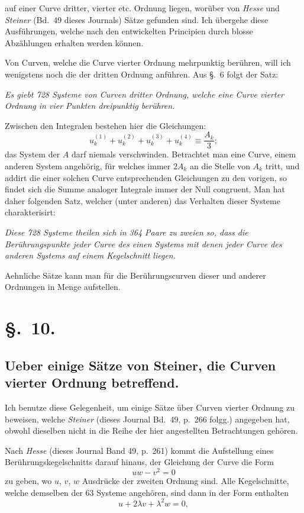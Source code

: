 \documentclass{article}
\begin{document}
auf einer Curve dritter, vierter etc. Ordnung liegen, worüber von \emph{Hesse} und \emph{Steiner} (Bd.\ 49 dieses Journals) Sätze gefunden sind. Ich übergehe diese Ausführungen, welche nach den entwickelten Principien durch blosse Abzählungen erhalten werden können.

Von Curven, welche die Curve vierter Ordnung mehrpunktig berühren, will ich wenigstens noch die der dritten Ordnung anführen. Aus §.~6 folgt der Satz:

\emph{Es giebt 728 Systeme von Curven dritter Ordnung, welche eine Curve vierter Ordnung in vier Punkten dreipunktig berühren.}

Zwischen den Integralen bestehen hier die Gleichungen:
\[
u_{k}^{(1)}+u_{k}^{(2)}+u_{k}^{(3)}+u_{k}^{(4)} \equiv \frac{A_{k}}{3};
\]
das System der $A$ darf niemals verschwinden. Betrachtet man eine Curve, einem anderen System angehörig, für welches immer $2A_{k}$ an die Stelle von $A_{k}$ tritt, und addirt die einer solchen Curve entsprechenden Gleichungen zu den vorigen, so findet sich die Summe analoger Integrale immer der Null congruent. Man hat daher folgenden Satz, welcher (unter anderen) das Verhalten dieser Systeme charakterisirt:

\emph{Diese 728 Systeme theilen sich in 364 Paare zu zweien so, dass die Berührungspunkte jeder Curve des einen Systems mit denen jeder Curve des anderen Systems auf einem Kegelschnitt liegen.}

Aehnliche Sätze kann man für die Berührungscurven dieser und anderer Ordnungen in Menge aufstellen.

\section*{§.~10.}

\subsection*{Ueber einige Sätze von Steiner, die Curven vierter Ordnung betreffend.}

Ich benutze diese Gelegenheit, um einige Sätze über Curven vierter Ordnung zu beweisen, welche \emph{Steiner} (dieses Journal Bd.\ 49, p.\ 266 folgg.) angegeben hat, obwohl dieselben nicht in die Reihe der hier angestellten Betrachtungen gehören.

Nach \emph{Hesse} (dieses Journal Band 49, p.\ 261) kommt die Aufstellung eines Berührungskegelschnitts darauf hinaus, der Gleichung der Curve die Form
\[
uw - v^{2} = 0
\]
zu geben, wo $u$, $v$, $w$ Ausdrücke der zweiten Ordnung sind. Alle Kegelschnitte, welche demselben der 63 Systeme angehören, sind dann in der Form enthalten
\[
u + 2\lambda v + \lambda^{2} w = 0,
\]
\end{document}

